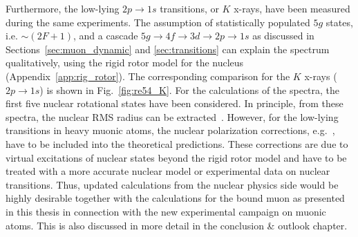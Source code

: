 Furthermore, the low-lying $2p\rightarrow1s$ transitions, or $K$ x-rays, have been measured during the same experiments. The assumption of statistically populated $5g$ states, i.e. $\sim (2F+1)$, and a cascade $5g\rightarrow 4f \rightarrow 3d \rightarrow 2p \rightarrow 1s$ as discussed in Sections~\ref{sec:muon_dynamic} and \ref{sec:transitions} can explain the spectrum qualitatively, using the rigid rotor model for the nucleus (Appendix~\ref{app:rig_rotor}). The corresponding comparison for the $K$ x-rays ($2p\rightarrow 1s$) is shown in Fig.~\ref{fig:re54_K}. For the calculations of the spectra, the first five nuclear rotational states have been considered. In principle, from these spectra, the nuclear RMS radius can be extracted~\cite{hitlin1970}. However, for the low-lying transitions in heavy muonic atoms, the nuclear polarization corrections, e.g.~\cite{chen1970}, have to be included into the theoretical predictions. These corrections are due to virtual excitations of nuclear states beyond the rigid rotor model and have to be treated with a more accurate nuclear model or experimental data on nuclear transitions. Thus, updated calculations from the nuclear physics side would be highly desirable together with the calculations for the bound muon as presented in this thesis in connection with the new experimental campaign on muonic atoms. 
This is also discussed in more detail in the conclusion \& outlook chapter.%
%

